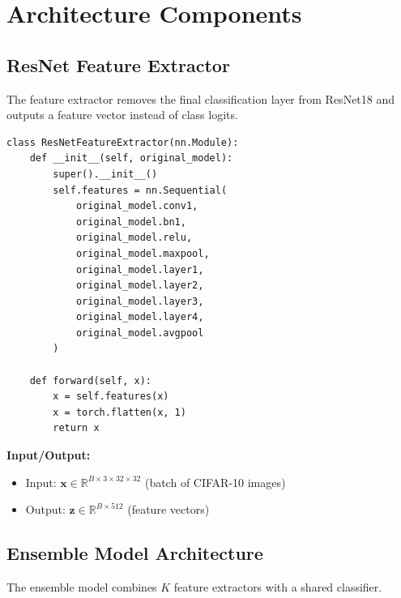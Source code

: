 \documentclass[11pt,a4paper]{article}
\newcommand{\R}{\mathbb{R}}
\begin{document}
\section{Architecture Components}

\subsection{ResNet Feature Extractor}

The feature extractor removes the final classification layer from ResNet18 and outputs a feature vector instead of class logits.

\begin{lstlisting}[caption={ResNet Feature Extractor Implementation}]
class ResNetFeatureExtractor(nn.Module):
    def __init__(self, original_model):
        super().__init__()
        self.features = nn.Sequential(
            original_model.conv1,
            original_model.bn1,
            original_model.relu,
            original_model.maxpool,
            original_model.layer1,
            original_model.layer2,
            original_model.layer3,
            original_model.layer4,
            original_model.avgpool
        )
    
    def forward(self, x):
        x = self.features(x)
        x = torch.flatten(x, 1)
        return x
\end{lstlisting}

\textbf{Input/Output:}
\begin{itemize}
    \item Input: $\mathbf{x} \in \R^{B \times 3 \times 32 \times 32}$ (batch of CIFAR-10 images)
    \item Output: $\mathbf{z} \in \R^{B \times 512}$ (feature vectors)
\end{itemize}

\subsection{Ensemble Model Architecture}

The ensemble model combines $K$ feature extractors with a shared classifier.
\end{document}
